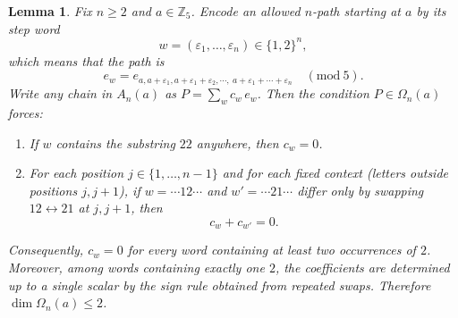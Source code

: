 \documentclass[11pt]{amsart}
\newcommand{\Z}{\mathbb Z}
\theoremstyle{plain}
\newtheorem{lemma}[theorem]{Lemma}
\theoremstyle{definition}
\numberwithin{equation}{section}
\begin{document}
\begin{lemma}
\label{lem:fixed-start-2dof}
Fix $n\ge 2$ and $a\in\Z_5$.
Encode an allowed $n$-path starting at $a$ by its step word
\[w=(\varepsilon_1,\dots,\varepsilon_n)\in\{1,2\}^n,\]
which means that the path is
\[e_w=e_{a, a+\varepsilon_1, a+\varepsilon_1+\varepsilon_2, \cdots,~ a+\varepsilon_1+\cdots+\varepsilon_n}\quad(\mathrm{mod}\ 5).\]
Write any chain in $A_n(a)$ as $P=\sum_w c_w\,e_w$.
Then the condition $P\in\Omega_n(a)$ forces:
\begin{enumerate}
\item If $w$ contains the substring $22$ anywhere, then $c_w=0$.
\item For each position $j\in\{1,\dots,n-1\}$ and for each fixed context (letters outside positions $j,j+1$),
if $w=\cdots 12\cdots$ and $w'=\cdots 21\cdots$ differ only by swapping $12\leftrightarrow 21$ at $j,j+1$, then
\[c_w+c_{w'}=0.\]
\end{enumerate}
Consequently, $c_w=0$ for every word containing at least two occurrences of $2$.
Moreover, among words containing exactly one $2$, the coefficients are determined up to a single scalar by the sign rule
obtained from repeated swaps.
Therefore $\dim\Omega_n(a)\le 2$.
\end{lemma}
\end{document}
